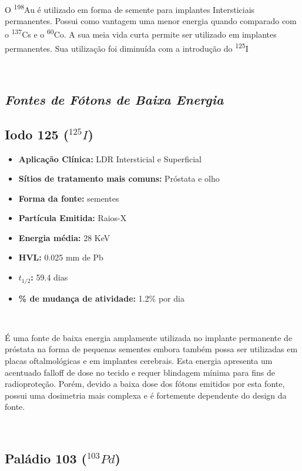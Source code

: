 \documentclass[11pt,a4paper]{article}
\begin{document}
			\

			O \textsuperscript{198}Au é utilizado em forma de semente para implantes Intersticiais permanentes. Possui como vantagem uma menor energia quando comparado com o \textsuperscript{137}Cs e o \textsuperscript{60}Co. A sua meia vida curta permite ser utilizado em implantes permanentes. Sua utilização foi diminuída com a introdução do \textsuperscript{125}I

			\

		
		\subsection*{\textbf{\textit{\textcolor{CarnationPink}{Fontes de  Fótons de Baixa Energia}}}}


		\subsection{Iodo 125 \textbf{\textcolor{CarnationPink}{(${}^{125}I$)}}}

			\begin{itemize}
				\item \textbf{Aplicação Clínica:} LDR Intersticial e Superficial
				\item \textbf{Sítios de tratamento mais comuns:} Próstata e olho
				\item \textbf{Forma da fonte:} sementes
				\item \textbf{Partícula Emitida:} Raios-X
				\item \textbf{Energia média: } 28 KeV
				\item \textbf{HVL:} 0.025 mm de Pb
				\item \textbf{$t_{1/2}$:} 59.4 dias
				\item \textbf{\% de mudança de atividade: } 1.2\% por dia
			\end{itemize}

			\

			É uma fonte de baixa energia amplamente utilizada no implante permanente de próstata na forma de pequenas sementes embora também possa ser utilizadas em placas oftalmológicas e em implantes cerebrais. Esta energia apresenta um acentuado falloff de dose no tecido e requer blindagem mínima para fins de radioproteção. Porém, devido a baixa dose dos fótons emitidos por esta fonte, possui uma dosimetria mais complexa e é fortemente dependente do design da fonte.

			\

		\subsection{Paládio 103 \textbf{\textcolor{CarnationPink}{(${}^{103}Pd$)}}}
\end{document}
